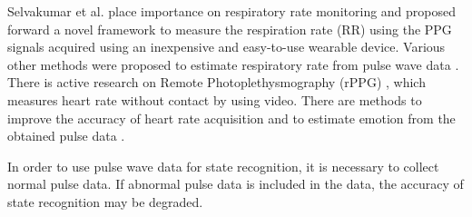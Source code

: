 \documentclass[sigconf]{acmart}
\begin{document}
Selvakumar et al.\cite{respiration_rate_estimation_selvakumar} place importance on respiratory rate monitoring and proposed forward a novel framework to measure the respiration rate (RR) using the PPG signals acquired using an inexpensive and easy-to-use wearable device.
Various other methods were proposed to estimate respiratory rate from pulse wave data \cite{respiratory_rate_estimation1, respiratory_rate_estimation2}.
There is active research on Remote Photoplethysmography (rPPG) \cite{r_ppg}, which measures heart rate without contact by using video. There are methods to improve the accuracy of heart rate acquisition \cite{r_ppg_heart_rate} and to estimate emotion from the obtained pulse data \cite{r_ppg_emotion_recognition_liu, r_ppg_emotion_recognition_li}.\par

In order to use pulse wave data for state recognition, it is necessary to collect normal pulse data. If abnormal pulse data is included in the data, the accuracy of state recognition may be degraded.


\end{document}
